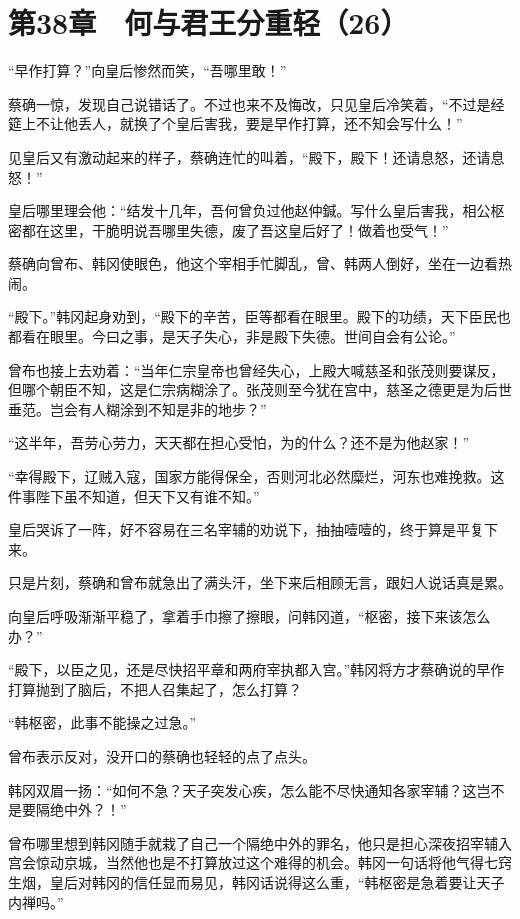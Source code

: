\section{第38章　何与君王分重轻（26）}

“早作打算？”向皇后惨然而笑，“吾哪里敢！”

蔡确一惊，发现自己说错话了。不过也来不及悔改，只见皇后冷笑着，“不过是经筵上不让他丢人，就换了个皇后害我，要是早作打算，还不知会写什么！”

见皇后又有激动起来的样子，蔡确连忙的叫着，“殿下，殿下！还请息怒，还请息怒！”

皇后哪里理会他：“结发十几年，吾何曾负过他赵仲鍼。写什么皇后害我，相公枢密都在这里，干脆明说吾哪里失德，废了吾这皇后好了！做着也受气！”

蔡确向曾布、韩冈使眼色，他这个宰相手忙脚乱，曾、韩两人倒好，坐在一边看热闹。

“殿下。”韩冈起身劝到，“殿下的辛苦，臣等都看在眼里。殿下的功绩，天下臣民也都看在眼里。今曰之事，是天子失心，非是殿下失德。世间自会有公论。”

曾布也接上去劝着：“当年仁宗皇帝也曾经失心，上殿大喊慈圣和张茂则要谋反，但哪个朝臣不知，这是仁宗病糊涂了。张茂则至今犹在宫中，慈圣之德更是为后世垂范。岂会有人糊涂到不知是非的地步？”

“这半年，吾劳心劳力，天天都在担心受怕，为的什么？还不是为他赵家！”

“幸得殿下，辽贼入寇，国家方能得保全，否则河北必然糜烂，河东也难挽救。这件事陛下虽不知道，但天下又有谁不知。”

皇后哭诉了一阵，好不容易在三名宰辅的劝说下，抽抽噎噎的，终于算是平复下来。

只是片刻，蔡确和曾布就急出了满头汗，坐下来后相顾无言，跟妇人说话真是累。

向皇后呼吸渐渐平稳了，拿着手巾擦了擦眼，问韩冈道，“枢密，接下来该怎么办？”

“殿下，以臣之见，还是尽快招平章和两府宰执都入宫。”韩冈将方才蔡确说的早作打算抛到了脑后，不把人召集起了，怎么打算？

“韩枢密，此事不能操之过急。”

曾布表示反对，没开口的蔡确也轻轻的点了点头。

韩冈双眉一扬：“如何不急？天子突发心疾，怎么能不尽快通知各家宰辅？这岂不是要隔绝中外？！”

曾布哪里想到韩冈随手就栽了自己一个隔绝中外的罪名，他只是担心深夜招宰辅入宫会惊动京城，当然他也是不打算放过这个难得的机会。韩冈一句话将他气得七窍生烟，皇后对韩冈的信任显而易见，韩冈话说得这么重，“韩枢密是急着要让天子内禅吗。”

